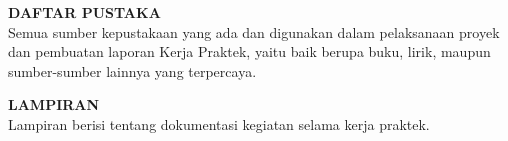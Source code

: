 \vspace{0.5cm}
\noindent \textbf{DAFTAR PUSTAKA} \\
Semua sumber kepustakaan yang ada dan digunakan dalam pelaksanaan proyek dan pembuatan laporan Kerja Praktek, yaitu baik berupa buku, lirik, maupun sumber-sumber lainnya yang terpercaya.

\vspace{0.5cm}
\noindent \textbf{LAMPIRAN} \\
Lampiran berisi tentang dokumentasi kegiatan selama kerja praktek.

